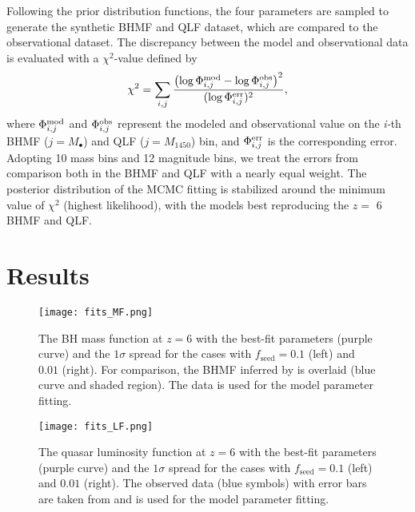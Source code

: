 \documentclass[twocolumn, twocolappendix]{aastex63}
\newcommand{\Mbh}{M_\bullet}
\newcommand{\fseed}{f_\mathrm{seed}}
\newcommand{\Muv}{M_{1450}}
\begin{document}
\begin{CJK*}{UTF8}{gbsn}
Following the prior distribution functions, the four parameters are sampled to generate the synthetic 
BHMF and QLF dataset, which are compared to the observational dataset. 
The discrepancy between the model and observational data is evaluated with a $\chi^2$-value defined by
\begin{align}
  \chi^2 = \sum_{i,j}
  \frac{\left(\log{\Phi^{\rm mod}_{i,j}} - \log{\Phi^{\rm obs}_{i,j}}\right)^2}{(\log{\Phi^{\rm err}_{i,j}})^2},
\end{align}
where $\Phi^{\rm mod}_{i,j}$ and $\Phi^{\rm obs}_{i,j}$ represent the modeled and observational value 
on the \textit{i-}th BHMF ($j=\Mbh$) and QLF ($j=\Muv$) bin, and $\Phi^{\rm err}_{i,j}$ is the corresponding error.
Adopting 10 mass bins and 12 magnitude bins, we treat the errors from comparison both in the BHMF and QLF
with a nearly equal weight.
The posterior distribution of the MCMC fitting is stabilized around the minimum value of $\chi^2$ (highest likelihood), 
with the models best reproducing the $z=$ 6 BHMF and QLF.



\vspace{2mm}
\section{Results}\label{sec:result}


\begin{figure*}
\centering
\texttt{[image: fits\_MF.png]}
\caption{
The BH mass function at $z=6$ with the best-fit parameters (purple curve) and the $1\sigma$ spread for the cases with $\fseed=0.1$ (left) and $0.01$ (right). 
For comparison, the BHMF inferred by  is overlaid (blue curve and shaded region).
The data is used for the model parameter fitting.
}
\label{fig:fitmf}
\end{figure*}


\begin{figure*}
\centering
\texttt{[image: fits\_LF.png]}
\caption{
The quasar luminosity function at $z=6$ with the best-fit parameters (purple curve) and the $1\sigma$ spread for the cases with $\fseed=0.1$ (left) and $0.01$ (right). 
The observed data (blue symbols) with error bars are taken from  and is used for the model parameter fitting.
}
\label{fig:fitlf}
\end{figure*}




\end{CJK*}
\end{document}
